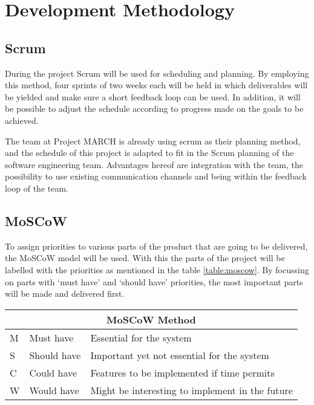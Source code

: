 \section{Development Methodology}\label{sec:devmet}

\subsection{Scrum}
During the project Scrum will be used for scheduling and planning. By employing this method, four sprints of two weeks each will be held in which deliverables will be yielded and make sure a short feedback loop can be used. In addition, it will be possible to adjust the schedule according to progress made on the goals to be achieved.

The team at Project MARCH is already using scrum as their planning method, and the schedule of this project is adapted to fit in the Scrum planning of the software engineering team. Advantages hereof are integration with the team, the possibility to use existing communication channels and being within the feedback loop of the team.

\subsection{MoSCoW}
To assign priorities to various parts of the product that are going to be delivered, the MoSCoW model will be used. With this the parts of the project will be labelled with the priorities as mentioned in the table \ref{table:moscow}. By focussing on parts with `must have' and `should have' priorities, the most important parts will be made and delivered first.\\[1cm]

{\renewcommand{\arraystretch}{1.5}
	\centering
	
	\begin{tabular}{ | l | l | l | }
		\multicolumn{3}{c}{\bfseries{MoSCoW Method}} \\ \hline
		M & Must have & Essential for the system\\ \hline
		S & Should have & Important yet not essential for the system \\ \hline
		C & Could have & Features to be implemented if time permits \\ \hline
		W & Would have & Might be interesting to implement in the future \\ \hline 
	\end{tabular}
	\label{table:moscow}
	
}
